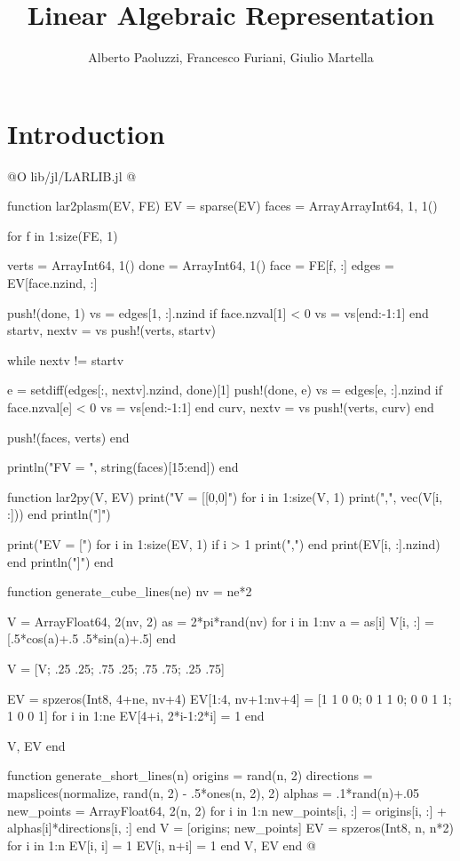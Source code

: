 \documentclass[10pt]{book}
\author{Alberto Paoluzzi, Francesco Furiani, Giulio Martella}
\title{Linear Algebraic Representation}
\begin{document}
\frontmatter
\maketitle
\tableofcontents

\mainmatter

\chapter{Introduction}

@O lib/jl/LARLIB.jl
@{function lar2plasm(EV, FE)
    EV = sparse(EV)
    faces = Array{Array{Int64, 1}, 1}()

    for f in 1:size(FE, 1)

        verts = Array{Int64, 1}()
        done = Array{Int64, 1}()
        face = FE[f, :]
        edges = EV[face.nzind, :]

        push!(done, 1)
        vs = edges[1, :].nzind
        if face.nzval[1] < 0
            vs = vs[end:-1:1]
        end
        startv, nextv = vs
        push!(verts, startv)

        while nextv != startv
            
            e = setdiff(edges[:, nextv].nzind, done)[1]
            push!(done, e)
            vs = edges[e, :].nzind
            if face.nzval[e] < 0
                vs = vs[end:-1:1]
            end
            curv, nextv = vs
            push!(verts, curv)
        end

        push!(faces, verts)
    end

    println("FV = ", string(faces)[15:end])
end

function lar2py(V, EV)
    print("V = [[0,0]")
    for i in 1:size(V, 1)
        print(",", vec(V[i, :]))
    end
    println("]")
    
    print("EV = [")
    for i in 1:size(EV, 1)
        if i > 1 print(",") end
        print(EV[i, :].nzind)
    end
    println("]")
end

function generate_cube_lines(ne)
    nv = ne*2
    
    V = Array{Float64, 2}(nv, 2)
    as = 2*pi*rand(nv)
    for i in 1:nv
        a = as[i]
        V[i, :] = [.5*cos(a)+.5 .5*sin(a)+.5]
    end
    
    V = [V; .25 .25; .75 .25; .75 .75; .25 .75]
    

    EV = spzeros(Int8, 4+ne, nv+4)
    EV[1:4, nv+1:nv+4] = [1 1 0 0; 0 1 1 0; 0 0 1 1; 1 0 0 1]
    for i in 1:ne
        EV[4+i, 2*i-1:2*i] = 1
    end
    
    V, EV
end


function generate_short_lines(n)
    origins = rand(n, 2)
    directions = mapslices(normalize, rand(n, 2) - .5*ones(n, 2), 2)
    alphas = .1*rand(n)+.05
    new_points = Array{Float64, 2}(n, 2)
    for i in 1:n
        new_points[i, :] = origins[i, :] + alphas[i]*directions[i, :]
    end
    V = [origins; new_points]
    EV = spzeros(Int8, n, n*2)
    for i in 1:n
        EV[i, i] = 1
        EV[i, n+i] = 1
    end
    V, EV
end
@}


\backmatter


{}

\end{document}
